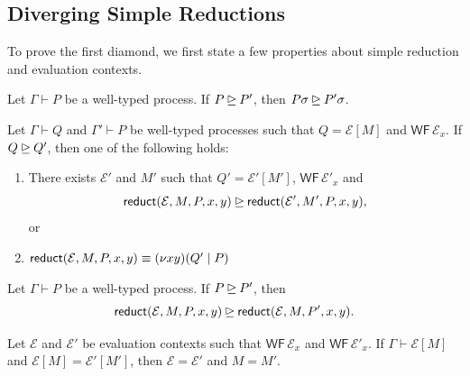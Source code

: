 \subsection{Diverging Simple Reductions}

To prove the first diamond, we first state a few properties about simple reduction
and evaluation contexts.

\begin{lemma} \label{lemma:simplred-invar-subst}
  Let $\Gamma \vdash P$ be a well-typed process. If $P \unrhd P'$, then
  $P\sigma \unrhd P'\sigma$.
\end{lemma}

\begin{lemma} \label{lemma:reduct-invar-red-ctx}
  Let $\Gamma \vdash Q$ and $\Gamma' \vdash P$ be well-typed processes such that $Q = \mathcal{E}[M]$
  and $\mathsf{WF} \, \mathcal{E}_x$. If $Q \unrhd Q'$, then one of the following holds:
  \begin{enumerate}[label=(\roman*)]
    \item There exists $\mathcal{E}'$ and $M'$ such that $Q' = \mathcal{E}'[M']$,
          $\mathsf{WF} \, \mathcal{E}'_x$ and
          \[
            \mathsf{reduct}(\mathcal{E}, M, P, x, y) \unrhd
            \mathsf{reduct}(\mathcal{E}', M', P, x, y),
          \]
          or
    \item $\mathsf{reduct}(\mathcal{E}, M, P, x, y) \equiv (\nu x y)(Q' \mid P)$
  \end{enumerate}
\end{lemma}

\begin{lemma} \label{lemma:reduct-invar-substituent}
  Let $\Gamma \vdash P$ be a well-typed process. If $P \unrhd P'$, then
  \[
    \mathsf{reduct}(\mathcal{E}, M, P, x, y) \unrhd
    \mathsf{reduct}(\mathcal{E}, M, P', x, y).
  \]
\end{lemma}

\begin{lemma} \label{lemma:uniq-eval-ctx}
  Let $\mathcal{E}$ and $\mathcal{E}'$ be evaluation contexts such that
  $\mathsf{WF} \, \mathcal{E}_x$ and $\mathsf{WF} \, \mathcal{E}'_x$.
  If $\Gamma \vdash \mathcal{E}[M]$ and $\mathcal{E}[M] = \mathcal{E}'[M']$, then $\mathcal{E} = \mathcal{E}'$ and
  $M = M'$.
\end{lemma}

